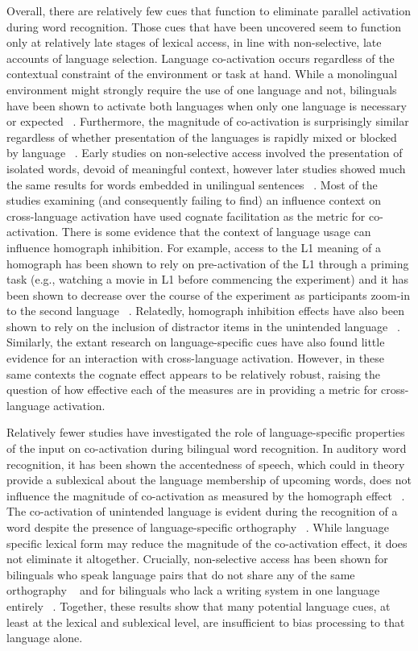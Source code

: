 Overall, there are relatively few cues that function to eliminate parallel activation during word recognition. Those cues that have been uncovered seem to function only at relatively late stages of lexical access, in line with non-selective, late accounts of language selection. Language co-activation occurs regardless of the contextual constraint of the environment or task at hand. While a monolingual environment might strongly require the use of one language and not, bilinguals have been shown to activate both languages when only one language is necessary or expected ~\citep{VanHell2002}. Furthermore, the magnitude of co-activation is surprisingly similar regardless of whether presentation of the languages is rapidly mixed or blocked by language ~\citep{Gullifer2013}. Early studies on non-selective access involved the presentation of isolated words, devoid of meaningful context, however later studies showed much the same results for words embedded in unilingual sentences ~\citep{Duyck2007, Libben2009, Schwartz2006}. Most of the studies examining (and consequently failing to find) an influence context on cross-language activation have used cognate facilitation as the metric for co-activation. There is some evidence that the context of language usage can influence homograph inhibition. For example, access to the L1 meaning of a homograph has been shown to rely on pre-activation of the L1 through a priming task (e.g., watching a movie in L1 before commencing the experiment) and it has been shown to decrease over the course of the experiment as participants zoom-in to the second language ~\citep[e.g.,][]{Elston-Guttler2005}. Relatedly, homograph inhibition effects have also been shown to rely on the inclusion of distractor items in the unintended language ~\citep{Dijkstra1998}. Similarly, the extant research on language-specific cues have also found little evidence for an interaction with cross-language activation. However, in these same contexts the cognate effect appears to be relatively robust, raising the question of how effective each of the measures are in providing a metric for cross-language activation. 

Relatively fewer studies have investigated the role of language-specific properties of the input on co-activation during bilingual word recognition. In auditory word recognition, it has been shown the accentedness of speech, which could in theory provide a sublexical about the language membership of upcoming words, does not influence the magnitude of co-activation as measured by the homograph effect ~\citep{Lagrou2011}. The co-activation of unintended language is evident during the recognition of a word despite the presence of language-specific orthography ~\citep{VanAssche2009}. While language specific lexical form may reduce the magnitude of the co-activation effect, it does not eliminate it altogether. Crucially, non-selective access has been shown for bilinguals who speak language pairs that do not share any of the same orthography ~\citep[such as Chinese and English;][]{Thierry2007} and for bilinguals who lack a writing system in one language entirely ~\citep{Morford2011}. Together, these results show that many potential language cues, at least at the lexical and sublexical level, are insufficient to bias processing to that language alone. 

